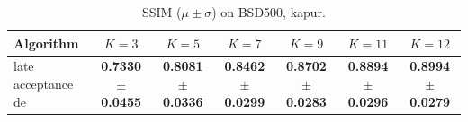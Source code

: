 \begin{table}[htbp]
\centering
\caption{SSIM ($\mu \pm \sigma$) on BSD500, kapur.}
\label{tab:exp1-kapur-ssim}
\begin{tabular}{lcccccc}
\toprule
Algorithm & $K=3$ & $K=5$ & $K=7$ & $K=9$ & $K=11$ & $K=12$ \\
\midrule
late acceptance de & \textbf{0.7330 $\pm$ 0.0455} & \textbf{0.8081 $\pm$ 0.0336} & \textbf{0.8462 $\pm$ 0.0299} & \textbf{0.8702 $\pm$ 0.0283} & \textbf{0.8894 $\pm$ 0.0296} & \textbf{0.8994 $\pm$ 0.0279} \\
\bottomrule
\end{tabular}
\end{table}